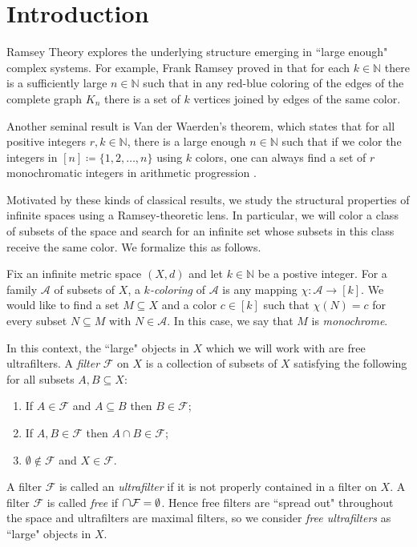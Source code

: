 \section{Introduction}
Ramsey Theory explores the underlying structure emerging in ``large enough" complex systems. For example, Frank Ramsey proved in \cite{ramsey:1930} that for each \( k \in \mathbb{N}  \) there is a sufficiently large \( n \in \mathbb{N}  \) such that in any red-blue coloring of the edges of the complete graph \( K_{n} \) there is a set of \( k \) vertices joined by edges of the same color.

Another seminal result is Van der Waerden's theorem, which states that for all positive integers \( r, k \in \mathbb{N}  \), there is a large enough \( n \in \mathbb{N}  \) such that if we color the integers in \( [n] \coloneqq \{ 1,2,\hdots ,n \}  \) using \( k \) colors, one can always find a set of \( r \) monochromatic integers in arithmetic progression \cite{waerden:1927}.

Motivated by these kinds of classical results, we study the structural properties of infinite spaces using a Ramsey-theoretic lens. In particular, we will color a class of subsets of the space and search for an infinite set whose subsets in this class receive the same color. We formalize this as follows.

Fix an infinite metric space \( (X,d) \) and let \( k \in \mathbb{N}  \) be a postive integer. For a family \( \mathcal{A} \) of subsets of \( X \), a \emph{\( k \)-coloring} of \( \mathcal{A}  \) is any mapping \( \chi : \mathcal{A} \to [k] \). We would like to find a set \( M \subseteq X \) and a color \( c \in [k] \) such that \( \chi(N) = c \) for every subset \( N \subseteq M \) with \(N \in \mathcal{A}  \). In this case, we say that \( M \) is \emph{monochrome}.

In this context, the ``large" objects in \( X \) which we will work with are free ultrafilters. A \emph{filter} \( \mathcal{F}  \) on \( X \) is a collection of subsets of \( X \) satisfying the following for all subsets \( A, B \subseteq X \):
\begin{enumerate}[leftmargin=1.2cm]
	
	\item If \( A \in \mathcal{F} \) and \( A \subseteq B \) then \( B \in \mathcal{F}  \);
	\item If \( A, B \in \mathcal{F}  \) then \( A \cap B \in \mathcal{F}  \);
	\item \( \emptyset  \notin \mathcal{F}  \) and \( X \in \mathcal{F}  \).
\end{enumerate}
A filter \( \mathcal{F}  \) is called an \emph{ultrafilter} if it is not properly contained in a filter on \( X \). A filter \( \mathcal{F}  \) is called \emph{free} if \( \medcap \mathcal{F} = \emptyset  \). Hence free filters are ``spread out" throughout the space and ultrafilters are maximal filters, so we consider \emph{free ultrafilters} as ``large" objects in \( X \).

